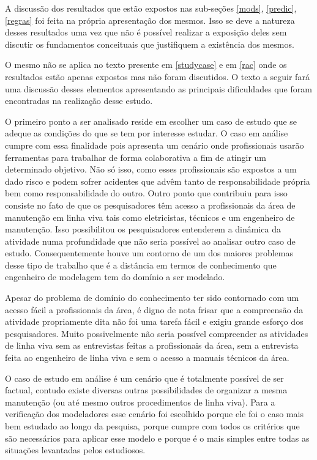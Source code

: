 A discussão dos resultados que estão expostos nas sub-seções \ref{mods}, \ref{predic}, \ref{regras} foi feita na própria apresentação dos mesmos. Isso se deve a natureza desses resultados uma vez que não é possível realizar a exposição deles sem discutir os fundamentos conceituais que justifiquem a existência dos mesmos. 

O mesmo não se aplica no texto presente em \ref{studycase} e em \ref{rac} onde os resultados estão apenas expostos mas não foram discutidos. O texto a seguir fará uma discussão desses elementos apresentando as principais dificuldades que foram encontradas na realização desse estudo. 

O primeiro ponto a ser analisado reside em escolher um caso de estudo que se adeque as condições do que se tem por interesse estudar. O caso em análise cumpre com essa finalidade pois apresenta um cenário onde profissionais usarão ferramentas para trabalhar de forma colaborativa a fim de atingir um determinado objetivo. Não só isso, como esses profissionais são expostos a um dado risco e podem sofrer acidentes que advêm tanto de responsabilidade própria bem como responsabilidade do outro. Outro ponto que contribuiu para isso consiste no fato de que os pesquisadores têm acesso a profissionais da área de manutenção em linha viva tais como eletricistas, técnicos e um engenheiro de manutenção. Isso possibilitou os pesquisadores entenderem a dinâmica da atividade numa profundidade que não seria possível ao analisar outro caso de estudo. Consequentemente houve um contorno de um dos maiores problemas desse tipo de trabalho que é a distância em termos de conhecimento que engenheiro de modelagem tem do domínio a ser modelado. 

Apesar do problema de domínio do conhecimento ter sido contornado com um acesso fácil a profissionais da área, é digno de nota frisar que a compreensão da atividade propriamente dita não foi uma tarefa fácil e exigiu grande esforço dos pesquisadores. Muito possivelmente não seria possível compreender as atividades de linha viva sem as entrevistas feitas a profissionais da área, sem a entrevista feita ao engenheiro de linha viva e sem o acesso a manuais técnicos da área. 

O caso de estudo em análise é um cenário que é totalmente possível de ser factual, contudo existe diversas outras possibilidades de organizar a mesma manutenção (ou até mesmo outros procedimentos de linha viva). Para a verificação dos modeladores esse cenário foi escolhido porque ele foi o caso mais bem estudado ao longo da pesquisa, porque cumpre com todos os critérios  que são necessários para aplicar esse modelo e porque é o mais simples entre todas as situações levantadas pelos estudiosos.

